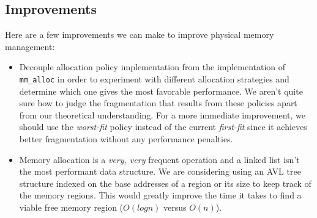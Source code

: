 


\subsection*{Improvements} \label{Improvements}
 Here are a few improvements we can make to improve physical memory management:
 \begin{itemize}
     \item Decouple allocation policy implementation from the implementation of \verb|mm_alloc| in order to experiment with different allocation strategies and determine which one gives the most favorable performance. We aren't quite sure how to judge the fragmentation that results from these policies apart from our theoretical understanding. For a more immediate improvement, we should use the \textit{worst-fit} policy instead of the current \textit{first-fit} since it achieves better fragmentation without any performance penalties.
     \item Memory allocation is a \textit{very, very} frequent operation and a linked list isn't the most performant data structure. We are considering using an AVL tree structure indexed on the base addresses of a region or its size to keep track of the memory regions. This would greatly improve the time it takes to find a viable free memory region ($O(logn)$ versus $O(n)$).
 \end{itemize}


